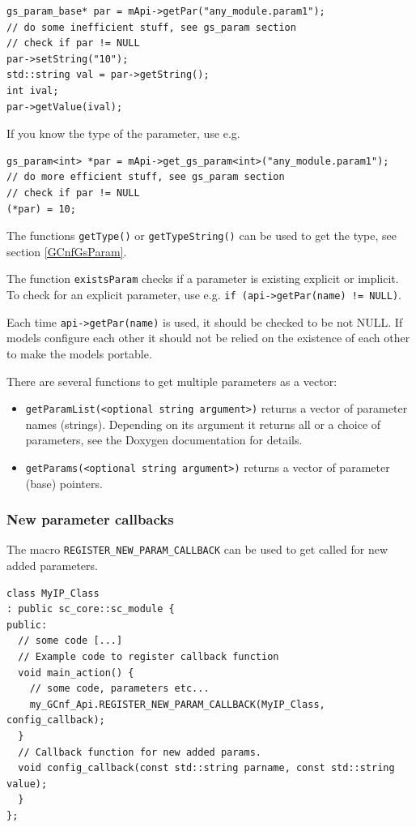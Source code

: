 \begin{lstlisting}
gs_param_base* par = mApi->getPar("any_module.param1");
// do some inefficient stuff, see gs_param section
// check if par != NULL
par->setString("10");
std::string val = par->getString();
int ival;
par->getValue(ival);
\end{lstlisting}

If you know the type of the parameter, use e.g.
\begin{lstlisting}
gs_param<int> *par = mApi->get_gs_param<int>("any_module.param1");
// do more efficient stuff, see gs_param section
// check if par != NULL
(*par) = 10;
\end{lstlisting}

The functions \lstinline|getType()| or \lstinline|getTypeString()| can be used to get the type, see section \ref{GCnfGsParam}.

The function \lstinline|existsParam| checks if a parameter is existing explicit or implicit. To check for an explicit parameter, use e.g. \lstinline|if (api->getPar(name) != NULL)|.

Each time \lstinline|api->getPar(name)| is used, it should be checked to be not NULL. If models configure each other it should not be relied on the existence of each other to make the models portable.

There are several functions to get multiple parameters as a vector:\vspace{-2ex}
\begin{itemize}
  \item \lstinline|getParamList(<optional string argument>)| returns a vector of parameter names (strings). Depending on its argument it returns all or a choice of parameters, see the Doxygen documentation for details.
  \item \lstinline|getParams(<optional string argument>)| returns a vector of parameter (base) pointers.
\end{itemize}

\subsubsection{New parameter callbacks}

The macro \lstinline|REGISTER_NEW_PARAM_CALLBACK| can be used to get called for new added parameters.

\begin{lstlisting}
class MyIP_Class
: public sc_core::sc_module {
public:
  // some code [...]
  // Example code to register callback function
  void main_action() {
    // some code, parameters etc...
    my_GCnf_Api.REGISTER_NEW_PARAM_CALLBACK(MyIP_Class, config_callback);
  }
  // Callback function for new added params.
  void config_callback(const std::string parname, const std::string value);
  }
};
\end{lstlisting}

